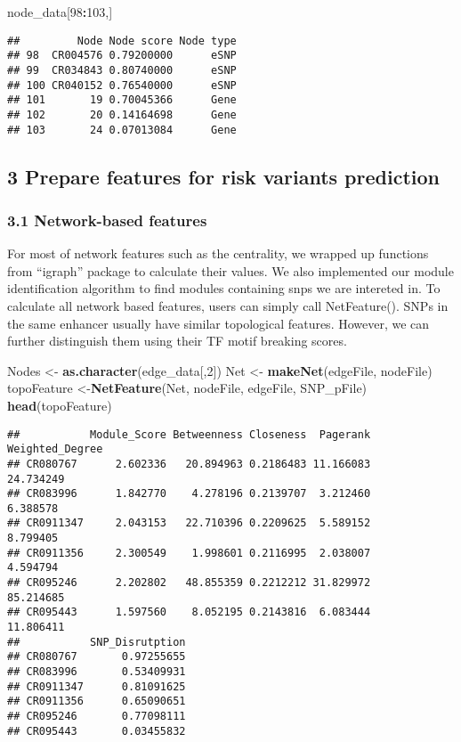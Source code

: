 \documentclass[]{article}
\newenvironment{Shaded}{\begin{snugshade}}{\end{snugshade}}
\newcommand{\KeywordTok}[1]{\textcolor[rgb]{0.13,0.29,0.53}{\textbf{#1}}}
\newcommand{\DecValTok}[1]{\textcolor[rgb]{0.00,0.00,0.81}{#1}}
\newcommand{\StringTok}[1]{\textcolor[rgb]{0.31,0.60,0.02}{#1}}
\newcommand{\OperatorTok}[1]{\textcolor[rgb]{0.81,0.36,0.00}{\textbf{#1}}}
\newcommand{\NormalTok}[1]{#1}
\begin{document}
\begin{Shaded}
\begin{Highlighting}[]
\NormalTok{node_data[}\DecValTok{98}\OperatorTok{:}\DecValTok{103}\NormalTok{,]}
\end{Highlighting}
\end{Shaded}

\begin{verbatim}
##         Node Node score Node type
## 98  CR004576 0.79200000      eSNP
## 99  CR034843 0.80740000      eSNP
## 100 CR040152 0.76540000      eSNP
## 101       19 0.70045366      Gene
## 102       20 0.14164698      Gene
## 103       24 0.07013084      Gene
\end{verbatim}

\subsection{3 Prepare features for risk variants
prediction}\label{prepare-features-for-risk-variants-prediction}

\subsubsection{3.1 Network-based features}\label{network-based-features}

For most of network features such as the centrality, we wrapped up
functions from ``igraph'' package to calculate their values. We also
implemented our module identification algorithm to find modules
containing snps we are intereted in. To calculate all network based
features, users can simply call NetFeature(). SNPs in the same enhancer
usually have similar topological features. However, we can further
distinguish them using their TF motif breaking scores.

\begin{Shaded}
\begin{Highlighting}[]
\NormalTok{Nodes <-}\StringTok{ }\KeywordTok{as.character}\NormalTok{(edge_data[,}\DecValTok{2}\NormalTok{])}
\NormalTok{Net <-}\StringTok{ }\KeywordTok{makeNet}\NormalTok{(edgeFile, nodeFile)}
\NormalTok{topoFeature <-}\KeywordTok{NetFeature}\NormalTok{(Net, nodeFile, edgeFile, SNP_pFile)}
\KeywordTok{head}\NormalTok{(topoFeature)}
\end{Highlighting}
\end{Shaded}

\begin{verbatim}
##           Module_Score Betweenness Closeness  Pagerank Weighted_Degree
## CR080767      2.602336   20.894963 0.2186483 11.166083       24.734249
## CR083996      1.842770    4.278196 0.2139707  3.212460        6.388578
## CR0911347     2.043153   22.710396 0.2209625  5.589152        8.799405
## CR0911356     2.300549    1.998601 0.2116995  2.038007        4.594794
## CR095246      2.202802   48.855359 0.2212212 31.829972       85.214685
## CR095443      1.597560    8.052195 0.2143816  6.083444       11.806411
##           SNP_Disrutption
## CR080767       0.97255655
## CR083996       0.53409931
## CR0911347      0.81091625
## CR0911356      0.65090651
## CR095246       0.77098111
## CR095443       0.03455832
\end{verbatim}
\end{document}
